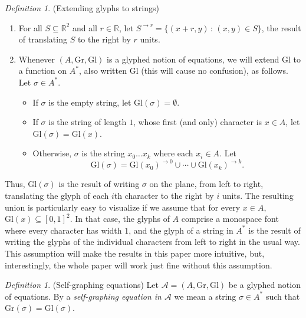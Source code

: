 \documentclass[table, svgnames, dvipsnames, letterpaper, 11pt]{report}
\theoremstyle{remark}
\newtheorem{definition}[theorem]{Definition}
\begin{document}
\begin{definition}
\label{extendingglyphsdefn}
  (Extending glyphs to strings)
  \begin{enumerate}
    \item
    For all $S\subseteq\mathbb R^2$ and all $r\in\mathbb R$,
    let $S^{\rightarrow r}=\{(x+r,y)\,:\,(x,y)\in S\}$, the result
    of translating $S$ to the right by $r$ units.
    \item
    Whenever $(A,\mathrm{Gr},\mathrm{Gl})$ is a glyphed notion of equations,
    we will extend $\mathrm{Gl}$ to a function on $A^*$,
    also written $\mathrm{Gl}$ (this will cause no confusion),
    as follows. Let $\sigma\in A^*$.
    \begin{itemize}
      \item If $\sigma$ is the empty string, let $\mathrm{Gl}(\sigma)=\emptyset$.
      \item If $\sigma$ is the string of length $1$, whose first (and only)
        character is $x\in A$, let $\mathrm{Gl}(\sigma)=\mathrm{Gl}(x)$.
      \item Otherwise, $\sigma$ is the string $x_0\ldots x_k$ where each
        $x_i\in A$. Let
        \[
          \mathrm{Gl}(\sigma)
          =
          \mathrm{Gl}(x_0)^{\rightarrow 0}
          \cup
          \cdots
          \cup
          \mathrm{Gl}(x_k)^{\rightarrow k}.
        \]
    \end{itemize}
  \end{enumerate}
\end{definition}

Thus, $\mathrm{Gl}(\sigma)$ is the result of writing $\sigma$ on the plane,
from left to right, translating the glyph of each $i$th character to the right
by $i$ units. The resulting union is particularly easy to visualize if we
assume that for every $x\in A$, $\mathrm{Gl}(x)\subseteq [0,1]^2$. In that case,
the glyphs of $A$ comprise a monospace font where every character has width $1$,
and the glyph of a string in $A^*$ is the result of writing the glyphs of the
individual characters from left to right in the usual way. This assumption will
make the results in this paper more intuitive, but, interestingly, the whole
paper will work just fine without this assumption.

\begin{definition}
  (Self-graphing equations)
  Let $\mathcal A=(A,\mathrm{Gr},\mathrm{Gl})$ be a glyphed notion of equations.
  By a \emph{self-graphing equation in $\mathcal A$} we mean a string
  $\sigma\in A^*$ such that $\mathrm{Gr}(\sigma)=\mathrm{Gl}(\sigma)$.
\end{definition}
\end{document}
